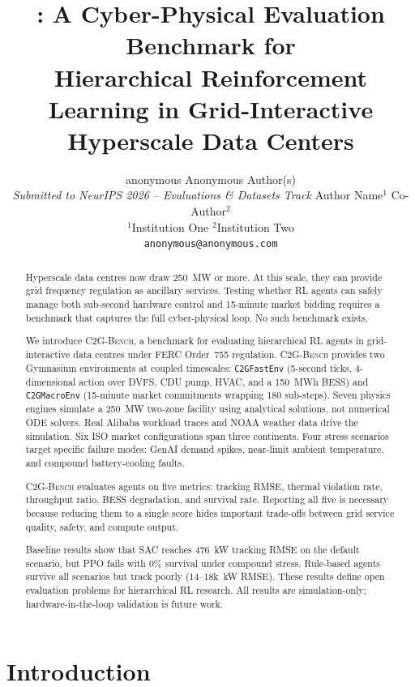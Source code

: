 \documentclass{article}
\title{\textbf{\cname{}: A Cyber-Physical Evaluation Benchmark for\\
       Hierarchical Reinforcement Learning in Grid-Interactive\\
       Hyperscale Data Centers}}
\author{%
  \ifcsname anonymous\endcsname
    Anonymous Author(s)\\
    \textit{Submitted to NeurIPS 2026 -- Evaluations \& Datasets Track}
  \else
    Author Name$^{1}$ \quad Co-Author$^{2}$\\
    $^{1}$Institution One \quad $^{2}$Institution Two\\
    \texttt{anonymous@anonymous.com}
  \fi
}
\newcommand{\cname}{\textsc{C2G-Bench}}
\newcommand{\envlow}{\texttt{C2GFastEnv}}
\newcommand{\envhigh}{\texttt{C2GMacroEnv}}
\begin{document}
\maketitle

\begin{abstract}
Hyperscale data centres now draw 250~MW or more.
At this scale, they can provide grid frequency regulation as ancillary services.
Testing whether RL agents can safely manage both sub-second hardware control and
15-minute market bidding requires a benchmark that captures the full
cyber-physical loop.
No such benchmark exists.

We introduce \cname{}, a benchmark for evaluating hierarchical RL agents in
grid-interactive data centres under FERC Order~755 regulation.
\cname{} provides two Gymnasium environments at coupled timescales:
\envlow{} (5-second ticks, 4-dimensional action over DVFS, CDU pump, HVAC,
and a 150~MWh BESS) and \envhigh{} (15-minute market commitments wrapping
180 sub-steps).
Seven physics engines simulate a 250~MW two-zone facility using analytical
solutions, not numerical ODE solvers.
Real Alibaba workload traces and NOAA weather data drive the simulation.
Six ISO market configurations span three continents.
Four stress scenarios target specific failure modes: GenAI demand spikes,
near-limit ambient temperature, and compound battery-cooling faults.

\cname{} evaluates agents on five metrics: tracking RMSE, thermal violation
rate, throughput ratio, BESS degradation, and survival rate.
Reporting all five is necessary because reducing them to a single score hides
important trade-offs between grid service quality, safety, and compute output.

Baseline results show that SAC reaches 476~kW tracking RMSE on the default
scenario, but PPO fails with 0\% survival under compound stress.
Rule-based agents survive all scenarios but track poorly (14--18k~kW RMSE).
These results define open evaluation problems for hierarchical RL research.
All results are simulation-only; hardware-in-the-loop validation is future work.
\end{abstract}

\section{Introduction}
\label{sec:intro}
\end{document}
